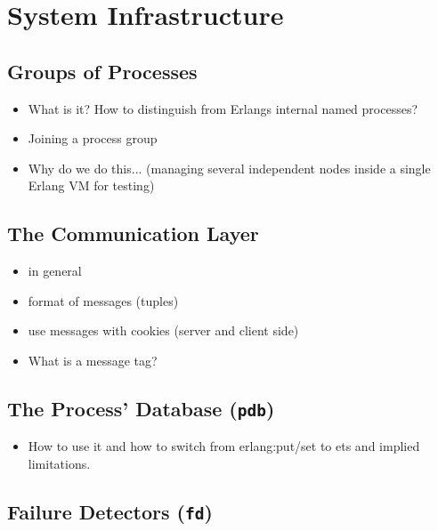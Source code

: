 \chapter{System Infrastructure}

\section{Groups of Processes}
\label{sec:pid_groups}

\begin{itemize}
\item What is it? How to distinguish from Erlangs internal named processes?
\item Joining a process group
\item Why do we do this... (managing several independent nodes inside a single
  Erlang VM for testing)
\end{itemize}

\section{\texorpdfstring{The Communication Layer }
          {The Communication Layer comm}}
\label{sec:comm}

\begin{itemize}
\item in general
\item format of messages (tuples)
\item use messages with cookies (server and client side)
\item What is a message tag?
\end{itemize}



\section{The Process' Database (\texttt{pdb})}

\begin{itemize}
\item How to use it and how to switch from erlang:put/set to ets and implied
  limitations.
\end{itemize}

\section{Failure Detectors (\texttt{fd})}

